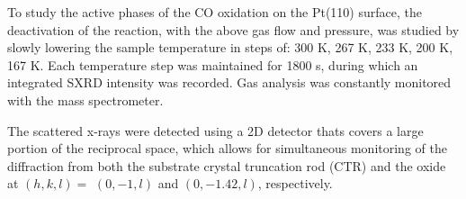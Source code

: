 \documentclass[aps,prl,groupedaddress,twocolumn]{revtex4-1}
\begin{document}
To study the active phases of the CO oxidation on the Pt(110) surface, the deactivation of the reaction, with the above gas flow and pressure, was studied by slowly lowering the sample temperature in steps of: 300 K, 267 K, 233 K, 200 K, 167 K. Each temperature step was maintained for 1800 s, during which an integrated SXRD intensity was recorded. Gas analysis was constantly monitored with the mass spectrometer.
 
The scattered x-rays were detected using a 2D detector thats covers a large portion of the reciprocal space, which allows for simultaneous monitoring of the diffraction from both the substrate crystal truncation rod (CTR) and the oxide at $(h,k,l)=$ $(0,-1,l)$ and $(0,-1.42,l)$, respectively.

\end{document}
